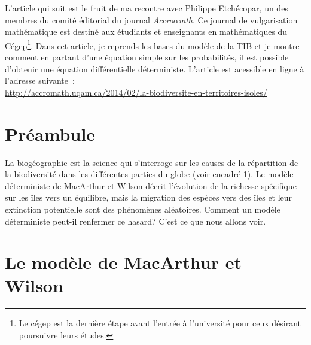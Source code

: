 \label{annI}
\addtocounter{chapter}{1}
\setcounter{equation}{0}

L'article qui suit est le fruit de ma recontre avec Philippe Etchécopar, un des membres du comité éditorial du journal \emph{Accro$\alpha$mth}.
Ce journal de vulgarisation mathématique est destiné aux étudiants et enseignants en mathématiques du Cégep\footnote{Le cégep est la dernière étape avant l'entrée à l'université pour ceux désirant poursuivre leurs études.}.
Dans cet article, je reprends les bases du modèle de la TIB et je montre comment en partant d'une équation simple sur les probabilités, il est possible d'obtenir une équation différentielle déterministe. L'article est acessible en ligne à l'adresse suivante~: \\ \url{http://accromath.uqam.ca/2014/02/la-biodiversite-en-territoires-isoles/}


\section{Préambule}
	La biogéographie est la science qui s’interroge sur les causes de la répartition de la biodiversité dans les différentes parties du globe (voir encadré 1). Le modèle déterministe de MacArthur et Wilson décrit l’évolution de la richesse spécifique sur les îles vers un équilibre, mais la migration des espèces vers des îles et leur extinction potentielle sont des phénomènes aléatoires. Comment un modèle déterministe peut-il renfermer ce hasard? C’est ce que nous allons voir.

\section{Le modèle de MacArthur et Wilson}


